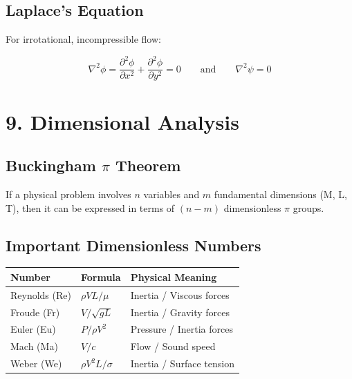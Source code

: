 \documentclass[12pt]{article}
\newcommand{\hcell}[1]{\textbf{\color{white}#1}}
\begin{document}
\subsection{Laplace's Equation}

For irrotational, incompressible flow:
\begin{formulabox}
\[
  \nabla^2\phi = \frac{\partial^2\phi}{\partial x^2} + \frac{\partial^2\phi}{\partial y^2} = 0
  \qquad \text{and} \qquad
  \nabla^2\psi = 0
\]
\end{formulabox}

\section{9. Dimensional Analysis}

\subsection{Buckingham $\pi$ Theorem}

\begin{thmbox}
If a physical problem involves $n$ variables and $m$ fundamental dimensions (M, L, T), then it can be expressed in terms of $(n - m)$ dimensionless $\pi$ groups.
\end{thmbox}

\subsection{Important Dimensionless Numbers}

\begin{center}
\renewcommand{\arraystretch}{1.5}
\begin{tabular}{|C{3.5cm}|C{4cm}|C{5cm}|}
\hline
{}
\hcell{Number} & \hcell{Formula} & \hcell{Physical Meaning} \\
\hline
Reynolds (Re) & $\rho VL/\mu$ & Inertia / Viscous forces \\
Froude (Fr) & $V/\sqrt{gL}$ & Inertia / Gravity forces \\
Euler (Eu) & $P/\rho V^2$ & Pressure / Inertia forces \\
Mach (Ma) & $V/c$ & Flow / Sound speed \\
Weber (We) & $\rho V^2 L/\sigma$ & Inertia / Surface tension \\
\hline
\end{tabular}
\end{center}
\end{document}
